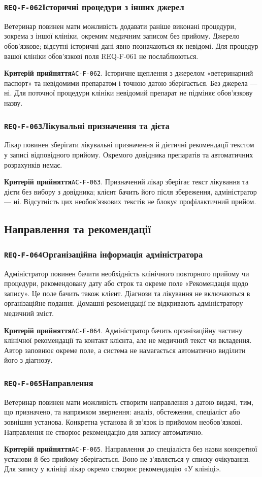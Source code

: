 \documentclass[11pt,a4paper]{article}
\newcommand{\requirement}[4]{%
  \Needspace{7\baselineskip}%
  \subsubsection*{\hypertarget{#1}{\texttt{#1}}\quad #2}%
  #3\par
  \textbf{Критерій прийняття}\quad #4\par\medskip}
\begin{document}
\requirement{REQ-F-062}{Історичні процедури з інших джерел}{Ветеринар повинен мати можливість додавати раніше виконані процедури, зокрема з іншої клініки, окремим медичним записом без прийому. Джерело обов’язкове; відсутні історичні дані явно позначаються як невідомі. Для процедур вашої клініки обов’язкові поля REQ-F-061 не послаблюються.}{\hypertarget{AC-F-062}{\texttt{AC-F-062}}. Історичне щеплення з джерелом «ветеринарний паспорт» та невідомими препаратом і точною датою зберігається. Без джерела — ні. Для поточної процедури клініки невідомий препарат не підміняє обов’язкову назву.}

\requirement{REQ-F-063}{Лікувальні призначення та дієта}{Лікар повинен зберігати лікувальні призначення й дієтичні рекомендації текстом у записі відповідного прийому. Окремого довідника препаратів та автоматичних розрахунків немає.}{\hypertarget{AC-F-063}{\texttt{AC-F-063}}. Призначений лікар зберігає текст лікування та дієти без вибору з довідника; клієнт бачить його після збереження, адміністратор — ні. Відсутність цих необов’язкових текстів не блокує профілактичний прийом.}

\subsection{Направлення та рекомендації}
\requirement{REQ-F-064}{Організаційна інформація адміністратора}{Адміністратор повинен бачити необхідність клінічного повторного прийому чи процедури, рекомендовану дату або строк та окреме поле «Рекомендація щодо запису». Це поле бачить також клієнт. Діагнози та лікування не включаються в організаційне подання. Домашні рекомендації не відкривають адміністратору медичний зміст.}{\hypertarget{AC-F-064}{\texttt{AC-F-064}}. Адміністратор бачить організаційну частину клінічної рекомендації та контакт клієнта, але не медичний текст чи вкладення. Автор заповнює окреме поле, а система не намагається автоматично виділити його з діагнозу.}

\requirement{REQ-F-065}{Направлення}{Ветеринар повинен мати можливість створити направлення з датою видачі, тим, що призначено, та напрямком звернення: аналіз, обстеження, спеціаліст або зовнішня установа. Конкретна установа й зв’язок із прийомом необов’язкові. Направлення не створює рекомендацію для запису автоматично.}{\hypertarget{AC-F-065}{\texttt{AC-F-065}}. Направлення до спеціаліста без назви конкретної установи й без прийому зберігається. Воно не з’являється у списку очікування. Для запису у клініці лікар окремо створює рекомендацію «У клініці».}
\end{document}
